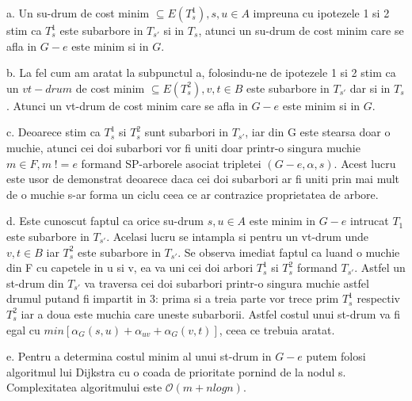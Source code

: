 \documentclass[11pt,leqno]{article}
\def\ClasaO{{\mathcal O}}
\begin{document}
a. Un su-drum de cost minim $ \subseteq E(T_s^1), s, u \in A$ impreuna cu ipotezele 1 si 2 stim ca $T_s^1$ este subarbore in $T_{s'}$ si in $T_s$, atunci un su-drum de cost minim care se afla in $G - e$ este minim si in $G$. 

b. La fel cum am aratat la subpunctul a, folosindu-ne de ipotezele 1 si 2 stim ca un $vt-drum$ de cost minim $ \subseteq E(T_s^2), v, t \in B$ este subarbore in $T_{s'}$ dar si in $T_s$. Atunci un vt-drum de cost minim care se afla in $G - e$ este minim si in $G$.

c. Deoarece stim ca $T_s^1$ si $T_s^2$ sunt subarbori in $T_{s'}$, iar din G este stearsa doar o muchie, atunci cei doi subarbori vor fi uniti doar printr-o singura muchie $m \in F, m\; != e$ formand SP-arborele asociat tripletei $(G - e, \alpha, s)$.
Acest lucru este usor de demonstrat deoarece daca cei doi subarbori ar fi uniti prin mai mult de o muchie s-ar forma un ciclu ceea ce ar contrazice proprietatea de arbore.

d. Este cunoscut faptul ca orice su-drum $s, u \in A$ este minim in $G - e$ intrucat $T_1$ este subarbore in $T_{s'}$. Acelasi lucru se intampla si pentru un vt-drum unde $v, t \in B$ iar $T_s^2$ este subarbore in $T_{s'}$.
Se observa imediat faptul ca luand o muchie din F cu capetele in u si v, ea va uni cei doi arbori $T_s^1$ si $T_s^2$ formand $T_{s'}$. Astfel un st-drum din $T_{s'}$ va traversa cei doi subarbori printr-o singura muchie astfel drumul putand fi impartit in 3:
prima si a treia parte vor trece prim $T_s^1$ respectiv $T_s^2$ iar a doua este muchia care uneste subarborii. Astfel costul unui st-drum va fi egal cu $min[\alpha_G(s, u) + \alpha_{uv} + \alpha_G(v, t)]$, ceea ce trebuia aratat.

e. Pentru a determina costul minim al unui st-drum in $G - e$ putem folosi algoritmul lui Dijkstra cu o coada de prioritate pornind de la nodul s. Complexitatea algoritmului este $\ClasaO(m + nlogn)$.
\end{document}
